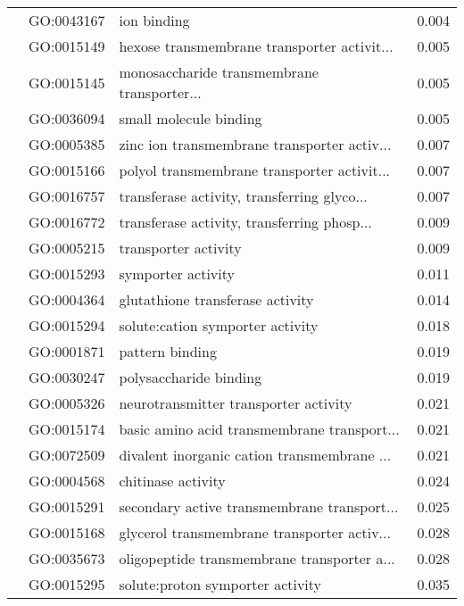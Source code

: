 \begin{longtable}{lllr}
   & GO:0043167 &                                  ion binding &         0.004 \\
   & GO:0015149 &  hexose transmembrane transporter activit... &         0.005 \\
   & GO:0015145 &  monosaccharide transmembrane transporter... &         0.005 \\
   & GO:0036094 &                       small molecule binding &         0.005 \\
   & GO:0005385 &  zinc ion transmembrane transporter activ... &         0.007 \\
   & GO:0015166 &  polyol transmembrane transporter activit... &         0.007 \\
   & GO:0016757 &  transferase activity, transferring glyco... &         0.007 \\
   & GO:0016772 &  transferase activity, transferring phosp... &         0.009 \\
   & GO:0005215 &                         transporter activity &         0.009 \\
   & GO:0015293 &                           symporter activity &         0.011 \\
   & GO:0004364 &             glutathione transferase activity &         0.014 \\
   & GO:0015294 &             solute:cation symporter activity &         0.018 \\
   & GO:0001871 &                              pattern binding &         0.019 \\
   & GO:0030247 &                       polysaccharide binding &         0.019 \\
   & GO:0005326 &        neurotransmitter transporter activity &         0.021 \\
   & GO:0015174 &  basic amino acid transmembrane transport... &         0.021 \\
   & GO:0072509 &  divalent inorganic cation transmembrane ... &         0.021 \\
   & GO:0004568 &                           chitinase activity &         0.024 \\
   & GO:0015291 &  secondary active transmembrane transport... &         0.025 \\
   & GO:0015168 &  glycerol transmembrane transporter activ... &         0.028 \\
   & GO:0035673 &  oligopeptide transmembrane transporter a... &         0.028 \\
   & GO:0015295 &             solute:proton symporter activity &         0.035 \\

\end{longtable}
